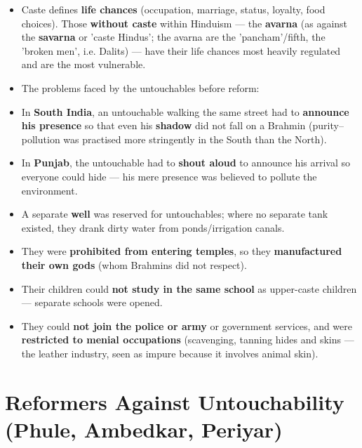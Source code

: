 \begin{KeyConcept}
\begin{itemize}
\item Caste defines \textbf{life chances} (occupation, marriage, status, loyalty, food choices). Those \textbf{without caste} within Hinduism --- the \textbf{avarna} (as against the \textbf{savarna} or 'caste Hindus'; the avarna are the 'pancham'/fifth, the 'broken men', i.e. Dalits) --- have their life chances most heavily regulated and are the most vulnerable.
\item The problems faced by the untouchables before reform:
\item In \textbf{South India}, an untouchable walking the same street had to \textbf{announce his presence} so that even his \textbf{shadow} did not fall on a Brahmin (purity--pollution was practised more stringently in the South than the North).
\item In \textbf{Punjab}, the untouchable had to \textbf{shout aloud} to announce his arrival so everyone could hide --- his mere presence was believed to pollute the environment.
\item A separate \textbf{well} was reserved for untouchables; where no separate tank existed, they drank dirty water from ponds/irrigation canals.
\item They were \textbf{prohibited from entering temples}, so they \textbf{manufactured their own gods} (whom Brahmins did not respect).
\item Their children could \textbf{not study in the same school} as upper-caste children --- separate schools were opened.
\item They could \textbf{not join the police or army} or government services, and were \textbf{restricted to menial occupations} (scavenging, tanning hides and skins --- the leather industry, seen as impure because it involves animal skin).
\end{itemize}
\end{KeyConcept}

\section{Reformers Against Untouchability (Phule, Ambedkar, Periyar)}

